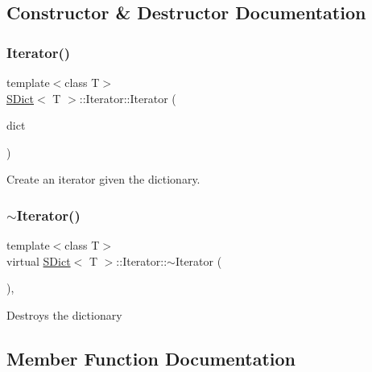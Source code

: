 \subsection{Constructor \& Destructor Documentation}
\mbox{\label{class_s_dict_1_1_iterator_a0c8bd359d5c6e57123216f52130b95bc}} 
\subsubsection{\texorpdfstring{Iterator()}{Iterator()}}
{\footnotesize\ttfamily template$<$class T$>$ \\
\mbox{\hyperlink{class_s_dict}{S\+Dict}}$<$ T $>$\+::Iterator\+::\+Iterator (\begin{DoxyParamCaption}\item[{const \mbox{\hyperlink{class_s_dict}{S\+Dict}}$<$ T $>$ \&}]{dict }\end{DoxyParamCaption})\hspace{0.3cm}{\ttfamily [inline]}}

Create an iterator given the dictionary. \mbox{\label{class_s_dict_1_1_iterator_a2b2dc67f8c7bf160bba90c79083edcd2}} 
\subsubsection{\texorpdfstring{$\sim$Iterator()}{~Iterator()}}
{\footnotesize\ttfamily template$<$class T$>$ \\
virtual \mbox{\hyperlink{class_s_dict}{S\+Dict}}$<$ T $>$\+::Iterator\+::$\sim$\+Iterator (\begin{DoxyParamCaption}{ }\end{DoxyParamCaption})\hspace{0.3cm}{\ttfamily [inline]}, {\ttfamily [virtual]}}

Destroys the dictionary 

\subsection{Member Function Documentation}
\mbox{\label{class_s_dict_1_1_iterator_a62d45b651b54c3d65fb00cea644509af}} 

